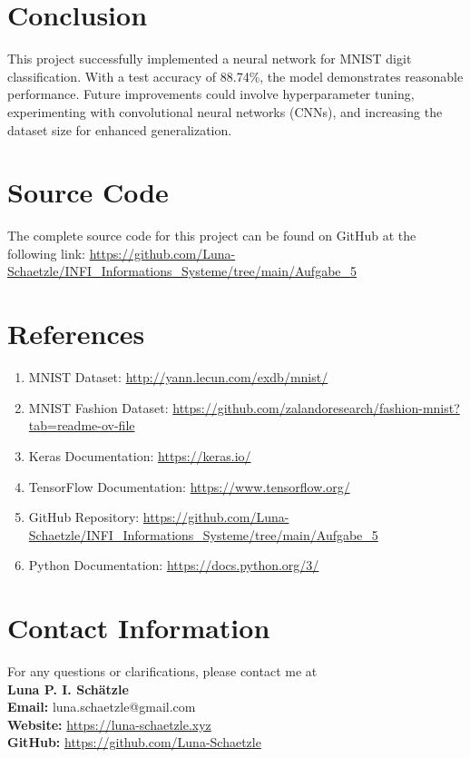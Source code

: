 \documentclass[12pt,a4paper]{article}
\begin{document}
\section*{Conclusion}
This project successfully implemented a neural network for MNIST digit classification. With a test accuracy of 88.74\%, the model demonstrates reasonable performance. Future improvements could involve hyperparameter tuning, experimenting with convolutional neural networks (CNNs), and increasing the dataset size for enhanced generalization.

\section*{Source Code}
The complete source code for this project can be found on GitHub at the following link: \url{https://github.com/Luna-Schaetzle/INFI_Informations_Systeme/tree/main/Aufgabe_5}

\section*{References}
\begin{enumerate}
    \item MNIST Dataset: \url{http://yann.lecun.com/exdb/mnist/}
    \item MNIST Fashion Dataset: \url{https://github.com/zalandoresearch/fashion-mnist?tab=readme-ov-file}
    \item Keras Documentation: \url{https://keras.io/}
    \item TensorFlow Documentation: \url{https://www.tensorflow.org/}
    \item GitHub Repository: \url{https://github.com/Luna-Schaetzle/INFI_Informations_Systeme/tree/main/Aufgabe_5}
    \item Python Documentation: \url{https://docs.python.org/3/}
\end{enumerate}

\section*{Contact Information}
For any questions or clarifications, please contact me at \\ 
\textbf{Luna P. I. Schätzle \\}
\textbf{Email:} luna.schaetzle@gmail.com \\
\textbf{Website:} \url{https://luna-schaetzle.xyz} \\
\textbf{GitHub:} \url{https://github.com/Luna-Schaetzle}
\end{document}
